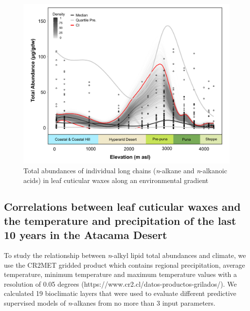 \documentclass[
  authoryear,
  preprint,
  3p]{elsarticle}
\begin{document}
\begin{figure}

{\centering \includegraphics{images/Fig_2S.png}

}

\caption{Total abundances of individual long chains (\emph{n}-alkane and
\emph{n}-alkanoic acids) in leaf cuticular waxes along an environmental
gradient}

\end{figure}

\hypertarget{correlations-between-leaf-cuticular-waxes-and-the-temperature-and-precipitation-of-the-last-10-years-in-the-atacama-desert}{%
\subsection{Correlations between leaf cuticular waxes and the
temperature and precipitation of the last 10 years in the Atacama
Desert}\label{correlations-between-leaf-cuticular-waxes-and-the-temperature-and-precipitation-of-the-last-10-years-in-the-atacama-desert}}

To study the relationship between \emph{n}-alkyl lipid total abundances
and climate, we use the CR2MET gridded product which contains regional
precipitation, average temperature, minimum temperature and maximum
temperature values with a resolution of 0.05 degrees
(https://www.cr2.cl/datos-productos-grilados/). We calculated 19
bioclimatic layers that were used to evaluate different predictive
supervised models of \emph{n}-alkanes from no more than 3 input
parameters.
\end{document}
